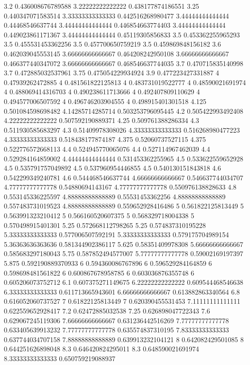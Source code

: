 {3.2 0.436008676789588
3.22222222222222 0.438177874186551
3.25 0.440347071583514
3.33333333333333 0.442516268980477
3.44444444444444 0.44468546637744
3.44444444444444 0.446854663774403
3.44444444444444 0.449023861171367
3.44444444444444 0.45119305856833
3.5 0.453362255965293
3.5 0.455531453362256
3.5 0.457700650759219
3.5 0.459869848156182
3.6 0.462039045553145
3.66666666666667 0.464208242950108
3.66666666666667 0.466377440347072
3.66666666666667 0.468546637744035
3.7 0.470715835140998
3.7 0.472885032537961
3.75 0.475054229934924
3.9 0.477223427331887
4 0.47939262472885
4 0.481561822125813
4 0.483731019522777
4 0.48590021691974
4 0.488069414316703
4 0.490238611713666
4 0.492407809110629
4 0.494577006507592
4 0.496746203904555
4 0.498915401301518
4.125 0.501084598698482
4.14285714285714 0.503253796095445
4.2 0.505422993492408
4.22222222222222 0.507592190889371
4.25 0.509761388286334
4.3 0.511930585683297
4.3 0.51409978308026
4.33333333333333 0.516268980477223
4.33333333333333 0.518438177874187
4.375 0.52060737527115
4.375 0.522776572668113
4.4 0.524945770065076
4.4 0.527114967462039
4.4 0.529284164859002
4.44444444444444 0.531453362255965
4.5 0.533622559652928
4.5 0.535791757049892
4.5 0.537960954446855
4.5 0.540130151843818
4.6 0.542299349240781
4.6 0.544468546637744
4.66666666666667 0.546637744034707
4.77777777777778 0.54880694143167
4.77777777777778 0.550976138828633
4.8 0.553145336225597
4.88888888888889 0.55531453362256
4.88888888888889 0.557483731019523
4.88888888888889 0.559652928416486
5 0.561822125813449
5 0.563991323210412
5 0.566160520607375
5 0.568329718004338
5 0.570498915401301
5.25 0.572668112798265
5.25 0.574837310195228
5.33333333333333 0.577006507592191
5.33333333333333 0.579175704989154
5.36363636363636 0.581344902386117
5.625 0.58351409978308
5.66666666666667 0.585683297180043
5.75 0.587852494577007
5.77777777777778 0.59002169197397
5.875 0.592190889370933
6 0.594360086767896
6 0.596529284164859
6 0.598698481561822
6 0.600867678958785
6 0.603036876355748
6 0.605206073752712
6.1 0.607375271149675
6.22222222222222 0.609544468546638
6.33333333333333 0.611713665943601
6.66666666666667 0.613882863340564
6.8 0.616052060737527
7 0.61822125813449
7 0.620390455531453
7.11111111111111 0.622559652928417
7.2 0.62472885032538
7.25 0.626898047722343
7.6 0.629067245119306
7.66666666666667 0.631236442516269
7.77777777777778 0.633405639913232
7.77777777777778 0.635574837310195
7.83333333333333 0.637744034707158
7.88888888888889 0.639913232104121
8 0.642082429501085
8 0.644251626898048
8.3 0.646420824295011
8.3 0.648590021691974
8.33333333333333 0.650759219088937
}
